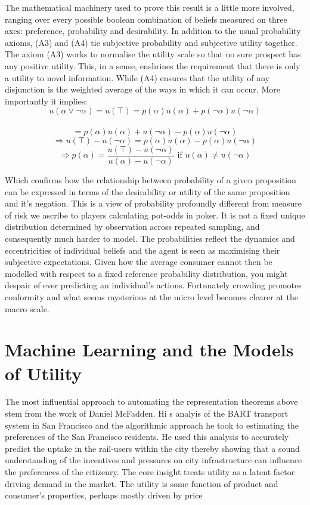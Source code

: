\documentclass[
]{book}
\theoremstyle{definition}
\theoremstyle{definition}
\theoremstyle{definition}
\theoremstyle{remark}
\begin{document}
The mathematical machinery used to prove this result is a little more involved, ranging over every possible boolean combination of beliefs measured on three axes: preference, probability and desirability. In addition to the usual probability axioms, (A3) and (A4) tie subjective probability and subjective utility together. The axiom (A3) works to normalise the utility scale so that no sure prospect has any positive utility. This, in a sense, enshrines the requirement that there is only a utility to novel information. While (A4) ensures that the utility of any disjunction is the weighted average of the ways in which it can occur. More importantly it implies:
\[u(\alpha \vee \neg\alpha) = u(\top) = p(\alpha)u(\alpha) + p(\neg\alpha)u(\neg\alpha)\]\\
\[= p(\alpha)u(\alpha) + u(\neg\alpha) - p(\alpha)u(\neg\alpha) \]
\[ \Rightarrow u(\top) - u(\neg\alpha) = p(\alpha)u(\alpha)  - p(\alpha)u(\neg\alpha)\]
\[ \Rightarrow p(\alpha) = \frac{u(\top) - u(\neg\alpha)}{ u(\alpha)  - u(\neg\alpha)} \text{  if } u(\alpha) \neq u(\neg\alpha) \]

Which confirms how the relationship between probability of a given proposition can be expressed in terms of the desirability or utility of the same proposition and it's negation. This is a view of probability profoundly different from measure of risk we ascribe to players calculating pot-odds in poker. It is not a fixed unique distribution determined by observation across repeated sampling, and consequently much harder to model. The probabilities reflect the dynamics and eccentricities of individual beliefs and the agent is seen as maximising their subjective expectations. Given how the average consumer cannot then be modelled with respect to a fixed reference probability distribution, you might despair of ever predicting an individual's actions. Fortunately crowding promotes conformity and what seems mysterious at the micro level becomes clearer at the macro scale.

\hypertarget{machine-learning-and-the-models-of-utility}{%
\section{Machine Learning and the Models of Utility}\label{machine-learning-and-the-models-of-utility}}

The most influential approach to automating the representation theorems above stem from the work of Daniel McFadden. Hi s analyis of the BART transport system in San Francisco and the algorithmic approach he took to estimating the preferences of the San Francisco residents. He used this analysis to accurately predict the uptake in the rail-users within the city thereby showing that a sound understanding of the incentives and pressures on city infrastructure can influence the preferences of the citizenry. The core insight treats utility as a latent factor driving demand in the market. The utility is some function of product and consumer's properties, perhaps mostly driven by price
\end{document}

